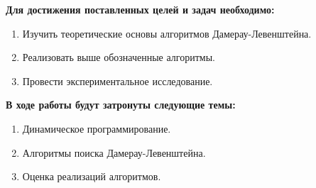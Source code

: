\textbf{Для достижения поставленных целей и задач необходимо:}
\begin{enumerate}
    \item Изучить теоретические основы алгоритмов Дамерау-Левенштейна.
    \item Реализовать выше обозначенные алгоритмы.
    \item Провести экспериментальное исследование.
\end{enumerate}

\textbf{В ходе работы будут затронуты следующие темы:}
\begin{enumerate}
\item Динамическое программирование.
\item Алгоритмы поиска Дамерау-Левенштейна.
\item Оценка реализаций алгоритмов.
\end{enumerate}

